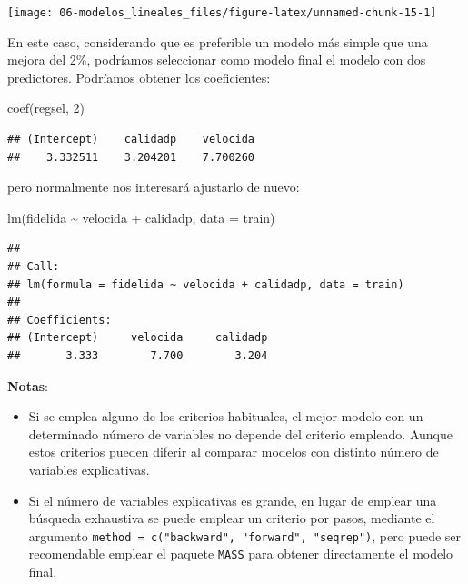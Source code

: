 \documentclass[
  spanish,
]{book}
\newenvironment{Shaded}{\begin{snugshade}}{\end{snugshade}}
\newcommand{\AttributeTok}[1]{\textcolor[rgb]{0.77,0.63,0.00}{#1}}
\newcommand{\DecValTok}[1]{\textcolor[rgb]{0.00,0.00,0.81}{#1}}
\newcommand{\FunctionTok}[1]{\textcolor[rgb]{0.00,0.00,0.00}{#1}}
\newcommand{\NormalTok}[1]{#1}
\newcommand{\SpecialCharTok}[1]{\textcolor[rgb]{0.00,0.00,0.00}{#1}}
\theoremstyle{break}
\theoremstyle{definition}
\theoremstyle{definition}
\theoremstyle{definition}
\theoremstyle{definition}
\theoremstyle{remark}
\begin{document}
\begin{center}\texttt{[image: 06-modelos\_lineales\_files/figure-latex/unnamed-chunk-15-1]} \end{center}

En este caso, considerando que es preferible un modelo más simple que una mejora del 2\%, podríamos seleccionar como modelo final el modelo con dos predictores.
Podríamos obtener los coeficientes:

\begin{Shaded}
\begin{Highlighting}[]
\FunctionTok{coef}\NormalTok{(regsel, }\DecValTok{2}\NormalTok{)}
\end{Highlighting}
\end{Shaded}

\begin{verbatim}
## (Intercept)    calidadp    velocida 
##    3.332511    3.204201    7.700260
\end{verbatim}

pero normalmente nos interesará ajustarlo de nuevo:

\begin{Shaded}
\begin{Highlighting}[]
\FunctionTok{lm}\NormalTok{(fidelida }\SpecialCharTok{\textasciitilde{}}\NormalTok{ velocida }\SpecialCharTok{+}\NormalTok{ calidadp, }\AttributeTok{data =}\NormalTok{ train)}
\end{Highlighting}
\end{Shaded}

\begin{verbatim}
## 
## Call:
## lm(formula = fidelida ~ velocida + calidadp, data = train)
## 
## Coefficients:
## (Intercept)     velocida     calidadp  
##       3.333        7.700        3.204
\end{verbatim}

\textbf{Notas}:

\begin{itemize}
\item
  Si se emplea alguno de los criterios habituales, el mejor modelo con un determinado
  número de variables no depende del criterio empleado.
  Aunque estos criterios pueden diferir al comparar modelos con distinto número de
  variables explicativas.
\item
  Si el número de variables explicativas es grande, en lugar de emplear una
  búsqueda exhaustiva se puede emplear un criterio por pasos, mediante el argumento
  \texttt{method\ =\ c("backward",\ "forward",\ "seqrep")}, pero puede ser recomendable
  emplear el paquete \texttt{MASS} para obtener directamente el modelo final.
\end{itemize}
\end{document}
